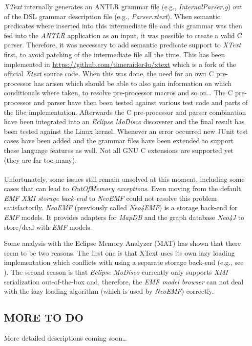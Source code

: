 {\it XText} internally generates an ANTLR grammar file (e.g., {\it InternalParser.g})
out of the DSL grammar description file (e.g., {\it Parser.xtext}).
When semantic predicates where inserted into this intermediate file and this
grammar was then fed into the {\it ANTLR} application as an input, it was possible
to create a valid C parser. 
Therefore, it was necessary to add semantic predicate support to {\it XText} first,
to avoid patching of the intermediate file all the time.
This has been implemented in \url{https://github.com/timeraider4u/xtext}
\cite{Xtext_mod}
which is a fork of the official {\it Xtext} source code.
When this was done, the need for an own C pre-processor has arisen
which should be able to also gain information on which conditionals 
where taken, to resolve pre-processor macros and so on\dots
The C pre-processor and parser
have then been tested against various test code and 
parts of the libc implementation.
Afterwards the C pre-processor and parser 
combination have been integrated into an {\it Eclipse MoDisco} discoverer
and the final result
has been tested against the Linux kernel. 
Whenever
an error occurred 
new JUnit test cases have been added and the grammar files
have been extended to support these language features as well.
Not all GNU C extensions are supported yet (they are far too many).
\\ \ \\
Unfortunately, some issues still remain unsolved at this moment, 
including some cases that can lead to {\it OutOfMemory exceptions}.
Even moving from the default {\it EMF XMI storage back-end} to
{\it NeoEMF} could not resolve this problem satisfactorily.
{\it NeoEMF}\cite{NeoEMF}
(previously called {\it Neo4EMF}) \cite{benelallam2014neo4emf}
is a storage back-end for {\it EMF} models. 
It provides adapters for {\it MapDB} and the graph database
{\it Neo4J} to store/deal with {\it EMF} models.

Some analysis with the Eclipse Memory Analyzer (MAT)
\cite{Eclipse_MAT}
\cite{Eclipse_MAT_2}
has shown that there seem to be two reasons:
The first one is that XText uses its own lazy loading implementation
which conflicts with using a separate storage back-end
(e.g., see \cite{NeoEMF_Xtext}).
The second reason is that {\it Eclipse MoDisco} currently 
only supports {\it XMI} serialization out-of-the-box and,
therefore, the {\it EMF model browser} can not deal 
with the lazy loading algorithm
(which is used by {\it NeoEMF})
correctly.

\subsection{MORE TO DO}
More detailed descriptions coming soon\dots

